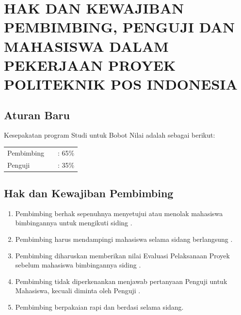 \chapter{HAK DAN KEWAJIBAN PEMBIMBING, PENGUJI DAN MAHASISWA
DALAM PEKERJAAN PROYEK POLITEKNIK POS INDONESIA}

\section{Aturan	Baru}
Kesepakatan	program	Studi untuk	Bobot	Nilai	adalah	sebagai	berikut:

\begin{table}[H]
\label{anjay}
\begin{tabular}{lll}
Pembimbing &  & : 65\% \\
Penguji &  & : 35\%
\end{tabular}
\end{table}

\section{Hak	dan	Kewajiban	Pembimbing}
\begin{enumerate}
\item Pembimbing	 berhak	 sepenuhnya	 menyetujui	 atau	 menolak	 mahasiswa	 bimbingannya	untuk	mengikuti	siding .
\item Pembimbing	harus	mendampingi	mahasiswa	selama	sidang	berlangsung .
\item Pembimbing	 diharuskan	 memberikan	 nilai	 Evaluasi	 Pelaksanaan Proyek	 sebelum	mahasiswa	bimbingannya	siding .
\item Pembimbing	 tidak	 diperkenankan	 menjawab	 pertanyaan	 Penguji	 untuk	 Mahasiswa,	kecuali	diminta	oleh	Penguji .
\item Pembimbing	berpakaian	rapi	dan	berdasi	selama	sidang.
\end{enumerate}

